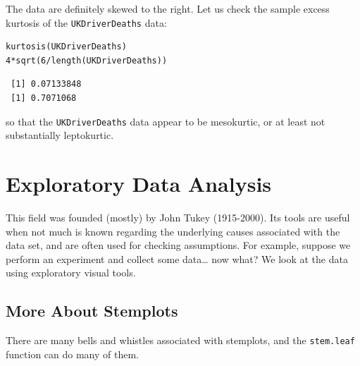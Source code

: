 \documentclass[captions=tableheading]{scrbook}
\begin{document}
The data are definitely skewed to the right. Let us check the sample excess kurtosis of the \texttt{UKDriverDeaths} data:


\begin{verbatim}
kurtosis(UKDriverDeaths)
4*sqrt(6/length(UKDriverDeaths))
\end{verbatim}

\begin{verbatim}
 [1] 0.07133848
 [1] 0.7071068
\end{verbatim}

so that the \texttt{UKDriverDeaths} data appear to be mesokurtic, or at least not substantially leptokurtic.
\section{Exploratory Data Analysis}
\label{sec-2-4}

\label{sec:Exploratory-Data-Analysis}

This field was founded (mostly) by John Tukey (1915-2000). Its tools are useful when not much is known regarding the underlying causes associated with the data set, and are often used for checking assumptions. For example, suppose we perform an experiment and collect some data\ldots{} now what? We look at the data using exploratory visual tools.
\subsection{More About Stemplots}
\label{sec-2-4-1}


There are many bells and whistles associated with stemplots, and the \texttt{stem.leaf} function can do many of them.
\end{document}
